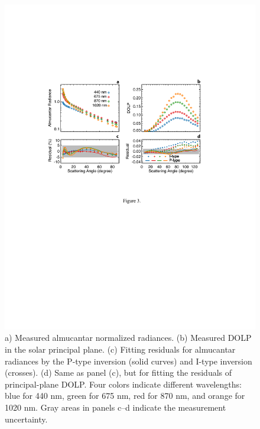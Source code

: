 \begin{figure}[t]
  \centering
  \includegraphics[width={\textwidth}]{figures/inv02.pdf}
  \caption{a) Measured almucantar normalized radiances. (b) Measured DOLP in
the solar principal plane. (c) Fitting residuals for almucantar radiances by
the P-type inversion (solid curves) and I-type inversion (crosses). (d) Same as
panel (c), but for fitting the residuals of principal-plane DOLP. Four colors
indicate different wavelengths: blue for 440 nm, green for 675 nm, red for 870
nm, and orange for 1020 nm. Gray areas in panels c–d indicate the measurement
uncertainty.}
  \label{fig:invfit}
\end{figure}

